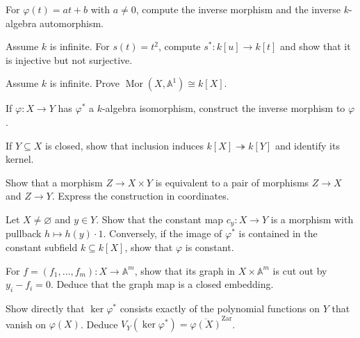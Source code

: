 \begin{exercise}\label{ex:vi04-affine-line-automorphism}
For \(\varphi(t)=at+b\) with \(a\neq0\), compute the inverse morphism and the inverse
\(k\)-algebra automorphism.
\end{exercise}

\begin{exercise}\label{ex:vi04-squaring}
Assume \(k\) is infinite.  For \(s(t)=t^2\), compute \(s^*:k[u]\to k[t]\) and show that it
is injective but not surjective.
\end{exercise}

\begin{exercise}\label{ex:vi04-maps-to-a1}
Assume \(k\) is infinite.  Prove \(\operatorname{Mor}(X,\mathbb A^1)\cong k[X]\).
\end{exercise}

\begin{exercise}\label{ex:vi04-iso-ring}
If \(\varphi:X\to Y\) has \(\varphi^*\) a \(k\)-algebra isomorphism, construct the inverse
morphism to \(\varphi\).
\end{exercise}

\begin{exercise}\label{ex:vi04-closed-quotient}
If \(Y\subseteq X\) is closed, show that inclusion induces \(k[X]\twoheadrightarrow k[Y]\)
and identify its kernel.
\end{exercise}

\begin{exercise}\label{ex:vi04-product-pair}
Show that a morphism \(Z\to X\times Y\) is equivalent to a pair of morphisms \(Z\to X\) and
\(Z\to Y\).  Express the construction in coordinates.
\end{exercise}

\begin{exercise}\label{ex:vi04-constant-map}
Let \(X\neq\varnothing\) and \(y\in Y\).  Show that the constant map \(c_y:X\to Y\) is a
morphism with pullback \(h\mapsto h(y)\cdot1\).  Conversely, if the image of \(\varphi^*\)
is contained in the constant subfield \(k\subseteq k[X]\), show that \(\varphi\) is constant.
\end{exercise}

\begin{exercise}\label{ex:vi04-graph}
For \(f=(f_1,\dots,f_m):X\to\mathbb A^m\), show that its graph in \(X\times\mathbb A^m\)
is cut out by \(y_i-f_i=0\).  Deduce that the graph map is a closed embedding.
\end{exercise}

\begin{exercise}\label{ex:vi04-kernel-image}
Show directly that \(\ker\varphi^*\) consists exactly of the polynomial functions on \(Y\)
that vanish on \(\varphi(X)\).  Deduce
\(V_Y(\ker\varphi^*)=\overline{\varphi(X)}^{\mathrm{Zar}}\).
\end{exercise}
